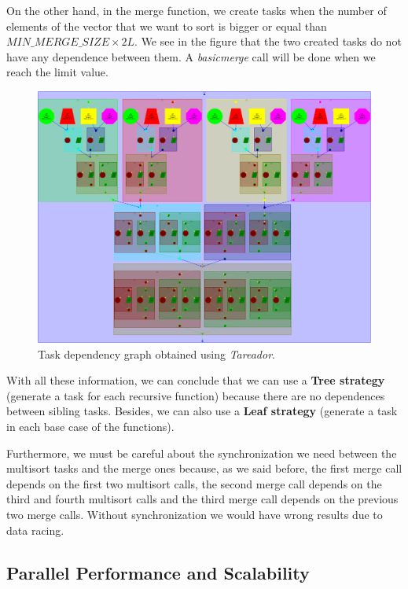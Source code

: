 \documentclass[12pt, a4paper]{article}
\begin{document}
On the other hand, in the merge function, we create tasks when the number of elements of the vector that we want to sort is bigger or equal than $MIN\_MERGE\_SIZE \times 2L$. We see in the figure that the two created tasks do not have any dependence between them. A \textit{basicmerge} call will be done when we reach the limit value.

\begin{figure}[H]
	\centering
	\includegraphics[scale=0.16]{./images/dependency_graph}
	
	\label{fig:TDG}
	\caption{Task dependency graph obtained using \textit{Tareador}.}
\end{figure}

With all these information, we can conclude that we can use a \textbf{Tree strategy} (generate a task for each recursive function) because there are no dependences between sibling tasks. Besides, we can also use a \textbf{Leaf strategy} (generate a task in each base case of the functions).

Furthermore, we must be careful about the synchronization we need between the multisort tasks and the merge ones because, as we said before, the first merge call depends on the first two multisort calls, the second merge call depends on the third and fourth multisort calls and the third merge call depends on the previous two merge calls. Without synchronization we would have wrong results due to data racing.

\subsection{Parallel Performance and Scalability}
\end{document}
